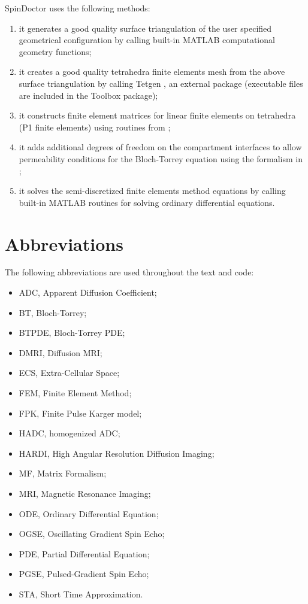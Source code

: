 \documentclass[a4paper]{article}
\begin{document}
SpinDoctor uses the following methods:
\begin{enumerate}
    \item it generates a good quality surface triangulation of the user specified geometrical configuration by calling built-in MATLAB computational geometry functions;
    \item it creates a good quality tetrahedra finite elements mesh from the above surface triangulation by calling Tetgen \cite{tetgen}, an external package (executable files are included in the Toolbox package);
    \item it constructs finite element matrices for linear finite elements on tetrahedra (P1 finite elements) using routines from \cite{RahmanValdman2013};
    \item it adds additional degrees of freedom on the compartment interfaces to allow permeability conditions for the	Bloch-Torrey equation using the formalism in \cite{Nguyen2014d};
    \item it solves the semi-discretized finite elements method equations by calling built-in MATLAB routines for solving ordinary differential equations.
\end{enumerate}




\section*{Abbreviations}
The following abbreviations are used throughout the text and code:
\begin{itemize}
    \item ADC, Apparent Diffusion Coefficient;
    \item BT, Bloch-Torrey;
    \item BTPDE, Bloch-Torrey PDE;
    \item DMRI, Diffusion MRI;
    \item ECS, Extra-Cellular Space;
    \item FEM, Finite Element Method;
    \item FPK, Finite Pulse Karger model;
    \item HADC, homogenized ADC;
    \item HARDI, High Angular Resolution Diffusion Imaging;
    \item MF, Matrix Formalism;
    \item MRI, Magnetic Resonance Imaging;
    \item ODE, Ordinary Differential Equation;
    \item OGSE, Oscillating Gradient Spin Echo;
    \item PDE, Partial Differential Equation;
    \item PGSE, Pulsed-Gradient Spin Echo;
    \item STA, Short Time Approximation.
\end{itemize}
\end{document}

